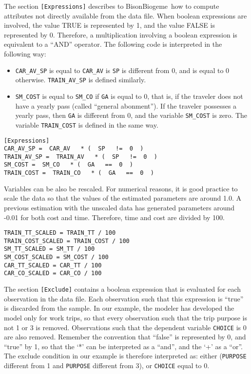 \documentclass[12pt,a4paper]{article}
\newcommand{\BBIOGEME}{BisonBiogeme}
\begin{document}
The section \lstinline$[Expressions]$ describes to \BBIOGEME\ how to
compute attributes not directly available from the data file. 
When boolean expressions are involved, the value TRUE is
  represented by 1, and the value FALSE is represented by
  0. Therefore, a multiplication involving a boolean expression is
  equivalent to a ``AND'' operator. The following code is interpreted in
  the following way:
\begin{itemize}
\item \lstinline$CAR_AV_SP$ is equal to \lstinline$CAR_AV$ is
  \lstinline$SP$ is different from 0, and is equal to 0
  otherwise. \lstinline$TRAIN_AV_SP$ is defined similarly.
\item \lstinline$SM_COST$ is equal to \lstinline$SM_CO$ if
  \lstinline$GA$ is equal to 0, that is, if the traveler does not have
  a yearly pass (called ``general abonment''). If the traveler
  possesses a yearly pass, then \lstinline$GA$ is different from 0,
  and the variable \lstinline$SM_COST$ is zero. The variable
  \lstinline$TRAIN_COST$ is defined in the same way.
\end{itemize}
\begin{lstlisting}[style=nonumbers]
[Expressions]
CAR_AV_SP =  CAR_AV   * (  SP   !=  0  )
TRAIN_AV_SP =  TRAIN_AV   * (  SP   !=  0  )
SM_COST =  SM_CO   * (  GA   ==  0  ) 
TRAIN_COST =  TRAIN_CO   * (  GA   ==  0  )
\end{lstlisting}

Variables can be also be rescaled. For numerical reasons, it is good
practice to scale the data so that the values of the estimated parameters are around 1.0. A previous estimation with the unscaled data has generated
parameters around -0.01 for both cost and time. Therefore, 
time and cost are divided by 100.

\begin{lstlisting}[style=nonumbers]
TRAIN_TT_SCALED = TRAIN_TT / 100
TRAIN_COST_SCALED = TRAIN_COST / 100
SM_TT_SCALED = SM_TT / 100
SM_COST_SCALED = SM_COST / 100
CAR_TT_SCALED = CAR_TT / 100
CAR_CO_SCALED = CAR_CO / 100
\end{lstlisting}

The section \lstinline$[Exclude]$ contains a boolean expression that
is evaluated for each observation in the data file.  Each observation
such that this expression is ``true'' is discarded from the
sample. In our example, the modeler has developed the model only for
work trips, so that every observation such that the trip purpose is not 1
or 3 is removed.
Observations such that the dependent variable \lstinline$CHOICE$ is 0 are also
removed. Remember the convention that ``false'' is represented by 0,
and ``true'' by 1, so that the `*' can be interpreted as a ``and'',
and the `+' as a ``or''. The exclude condition in our example is
therefore interpreted as: either (\lstinline$PURPOSE$ different from 1
and \lstinline$PURPOSE$ different from 3), or \lstinline$CHOICE$ equal
to 0. 
\end{document}
